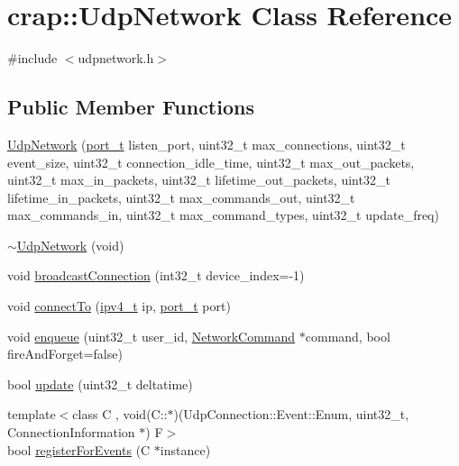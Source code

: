 \hypertarget{classcrap_1_1_udp_network}{}\section{crap\+:\+:Udp\+Network Class Reference}
\label{classcrap_1_1_udp_network}


{\ttfamily \#include $<$udpnetwork.\+h$>$}

\subsection*{Public Member Functions}
\begin{DoxyCompactItemize}
\item 
\hyperlink{classcrap_1_1_udp_network_adcb731ce23b46c95ba91a7acb42614dc}{Udp\+Network} (\hyperlink{namespacecrap_a21d8c14ae6ca715c519ff369042149dd}{port\+\_\+t} listen\+\_\+port, uint32\+\_\+t max\+\_\+connections, uint32\+\_\+t event\+\_\+size, uint32\+\_\+t connection\+\_\+idle\+\_\+time, uint32\+\_\+t max\+\_\+out\+\_\+packets, uint32\+\_\+t max\+\_\+in\+\_\+packets, uint32\+\_\+t lifetime\+\_\+out\+\_\+packets, uint32\+\_\+t lifetime\+\_\+in\+\_\+packets, uint32\+\_\+t max\+\_\+commands\+\_\+out, uint32\+\_\+t max\+\_\+commands\+\_\+in, uint32\+\_\+t max\+\_\+command\+\_\+types, uint32\+\_\+t update\+\_\+freq)
\item 
\hyperlink{classcrap_1_1_udp_network_a7e8fc66a65c4d4ce10d51fa1e89e2c5e}{$\sim$\+Udp\+Network} (void)
\item 
void \hyperlink{classcrap_1_1_udp_network_a3c9a6fb8007975eed2bca6d154474f33}{broadcast\+Connection} (int32\+\_\+t device\+\_\+index=-\/1)
\item 
void \hyperlink{classcrap_1_1_udp_network_af5b7f4e1171d05a772fd13a81aee27cb}{connect\+To} (\hyperlink{namespacecrap_a9ef32279067e77955c9f269926a331ee}{ipv4\+\_\+t} ip, \hyperlink{namespacecrap_a21d8c14ae6ca715c519ff369042149dd}{port\+\_\+t} port)
\item 
void \hyperlink{classcrap_1_1_udp_network_aed2e9796b0498a662d1656c2486ec1ba}{enqueue} (uint32\+\_\+t user\+\_\+id, \hyperlink{classcrap_1_1_network_command}{Network\+Command} $\ast$command, bool fire\+And\+Forget=false)
\item 
bool \hyperlink{classcrap_1_1_udp_network_a2da693f836a8ae12aa0d2a21ab4b25e2}{update} (uint32\+\_\+t deltatime)
\item 
{\footnotesize template$<$class C , void(\+C\+::$\ast$)(\+Udp\+Connection\+::\+Event\+::\+Enum, uint32\+\_\+t, Connection\+Information $\ast$) F$>$ }\\bool \hyperlink{classcrap_1_1_udp_network_a061a04afa4c168e4ddbfbb395583adf4}{register\+For\+Events} (C $\ast$instance)

\end{DoxyCompactItemize}
